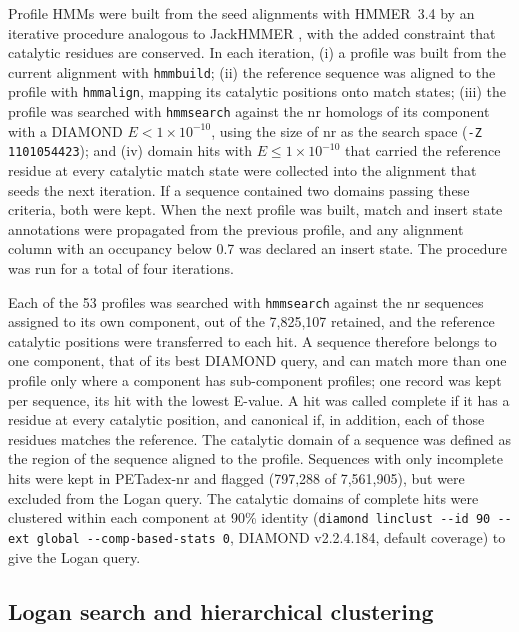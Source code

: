 \documentclass[pdflatex,sn-nature,iicol]{sn-jnl}%
\begin{document}
Profile HMMs were built from the seed alignments with HMMER~3.4 \citep{eddy2011hmmer} by an iterative procedure analogous to JackHMMER \citep{johnson2010jackhmmer}, with the added constraint that catalytic residues are conserved. In each iteration, (i) a profile was built from the current alignment with \texttt{hmmbuild}; (ii) the reference sequence was aligned to the profile with \texttt{hmmalign}, mapping its catalytic positions onto match states; (iii) the profile was searched with \texttt{hmmsearch} against the nr homologs of its component with a DIAMOND $E < 1\times10^{-10}$, using the size of nr as the search space (\texttt{-Z 1101054423}); and (iv) domain hits with $E \le 1\times10^{-10}$ that carried the reference residue at every catalytic match state were collected into the alignment that seeds the next iteration. If a sequence contained two domains passing these criteria, both were kept. When the next profile was built, match and insert state annotations were propagated from the previous profile, and any alignment column with an occupancy below 0.7 was declared an insert state. The procedure was run for a total of four iterations.


Each of the 53 profiles was searched with \texttt{hmmsearch} against the nr sequences assigned to its own component, out of the 7,825,107 retained, and the reference catalytic positions were transferred to each hit. A sequence therefore belongs to one component, that of its best DIAMOND query, and can match more than one profile only where a component has sub-component profiles; one record was kept per sequence, its hit with the lowest E-value. A hit was called complete if it has a residue at every catalytic position, and canonical if, in addition, each of those residues matches the reference. The catalytic domain of a sequence was defined as the region of the sequence aligned to the profile. Sequences with only incomplete hits were kept in PETadex-nr and flagged (797,288 of 7,561,905), but were excluded from the Logan query. The catalytic domains of complete hits were clustered within each component at 90\% identity (\texttt{diamond linclust -{}-id 90 -{}-ext global -{}-comp-based-stats 0}, DIAMOND v2.2.4.184, default coverage) to give the Logan query.

\subsection{Logan search and hierarchical clustering}
\end{document}
